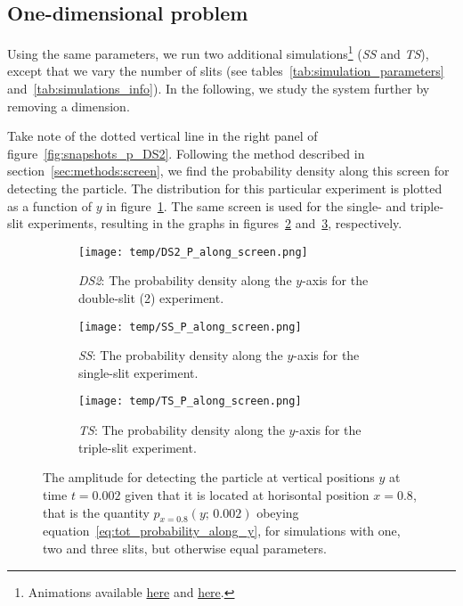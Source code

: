 \subsection{One-dimensional problem}

    Using the same parameters, we run two additional simulations\footnote{Animations available \href{\animlink/SS_anim.mp4}{here} and \href{\animlink/TS_anim.mp4}{here}.} (\textit{SS} and \textit{TS}), except that we vary the number of slits (see tables~\ref{tab:simulation_parameters} and~\ref{tab:simulations_info}). In the following, we study the system further by removing a dimension.

    Take note of the dotted vertical line in the right panel of figure~\ref{fig:snapshots_p_DS2}. Following the method described in section~\ref{sec:methods:screen}, we find the probability density along this screen for detecting the particle.  The distribution for this particular experiment is plotted as a function of $y$ in figure~\ref{fig:p_along_y_DS2}. The same screen is used for the single- and triple-slit experiments, resulting in the graphs in figures~\ref{fig:p_along_y_SS} and~\ref{fig:p_along_y_TS}, respectively. %

    \begin{figure}
        \centering
        \begin{subfigure}{0.46\textwidth}
            \texttt{[image: temp/DS2\_P\_along\_screen.png]}
            \caption{\textit{DS2}: The probability density along the $y$-axis for the double-slit (2) experiment.}
            \label{fig:p_along_y_DS2}
        \end{subfigure}
        \hfill
        \begin{subfigure}{0.46\textwidth}
            \texttt{[image: temp/SS\_P\_along\_screen.png]}
            \caption{\textit{SS}: The probability density along the $y$-axis for the single-slit experiment.}
            \label{fig:p_along_y_SS}
        \end{subfigure}
        \hfill
        \begin{subfigure}{0.46\textwidth}
            \texttt{[image: temp/TS\_P\_along\_screen.png]}
            \caption{\textit{TS}: The probability density along the $y$-axis for the triple-slit experiment.}
            \label{fig:p_along_y_TS}
        \end{subfigure}
        \caption{The amplitude for detecting the particle at vertical positions $y$ at time $t=0.002$ given that it is located at horisontal position $x=0.8$, that is the quantity $p_{x=0.8}(y;\, 0.002)$ obeying equation~\eqref{eq:tot_probability_along_y}, for simulations with one, two and three slits, but otherwise equal parameters.}
        \label{fig:p_along_y}
    \end{figure}






